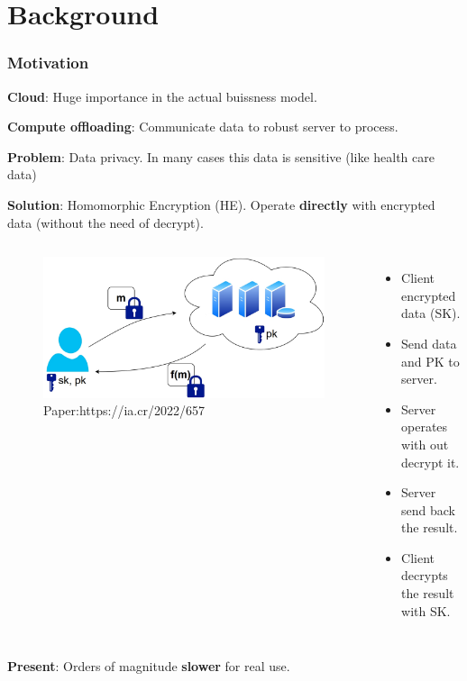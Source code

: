 \documentclass[10pt,handout]{beamer}
\begin{document}
\section{Background}
\begin{frame}
    \frametitle{Motivation}

        \textbf{Cloud}: Huge importance in the actual buissness model.
    \vspace{-0.3cm}

        \textbf{Compute offloading}: Communicate data to robust server to process.
    \vspace{-0.3cm}

\pause
        \textbf{Problem}: Data privacy. In many cases this data is sensitive (like health care data)
    \vspace{-0.3cm}


\pause
          \textbf{Solution}: Homomorphic Encryption (HE). Operate \textbf{directly} with encrypted data (without the need of decrypt).
          \pause
\begin{columns}
    \begin{figure}
    \includegraphics[scale=0.13]{fhe.jpg}
    \caption{Paper:https://ia.cr/2022/657}
    \end{figure}
    \begin{itemize}
        \item Client encrypted data (SK).
        \item Send data and PK to server.
        \item Server operates with out decrypt it.
        \item Server send back the result.
        \item Client decrypts the result with SK.
    \end{itemize}
\end{columns}
\pause
\pause
    \vspace{-0.2cm}
    \textbf{Present}: Orders of magnitude \textbf{slower} for real use.
\end{frame}
\end{document}
